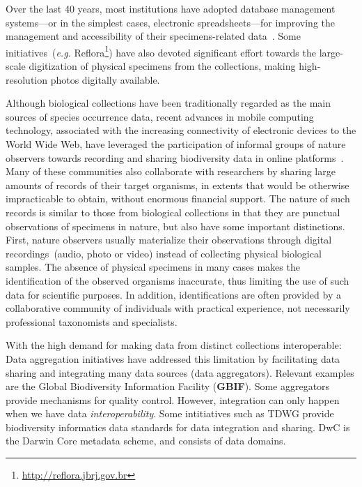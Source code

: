 

Over the last 40 years, most institutions have adopted database management systems---or in the simplest cases, electronic spreadsheets---for improving the management and accessibility of their specimens-related data~\cite{Sunderland2013}.
Some initiatives~(\textit{e.g.} Reflora\footnote{\url{http://reflora.jbrj.gov.br}}) have also devoted significant effort towards the large-scale digitization of physical specimens from the collections, making high-resolution photos digitally available.

Although biological collections have been traditionally regarded as the main sources of species occurrence data, recent advances in mobile computing technology, associated with the increasing connectivity of electronic devices to the World Wide Web, have leveraged the participation of informal groups of nature observers towards recording and sharing biodiversity data in online platforms~\cite{Silvertown2009}.
Many of these communities also collaborate with researchers by sharing large amounts of records of their target organisms, in extents that would be otherwise impracticable to obtain, without enormous financial support.
The nature of such records is similar to those from biological collections in that they are punctual observations of specimens in nature, but also have some important distinctions.
First, nature observers usually materialize their observations through digital recordings~(audio, photo or video) instead of collecting physical biological samples.
The absence of physical specimens in many cases makes the identification of the observed organisms inaccurate, thus limiting the use of such data for scientific purposes.
In addition, identifications are often provided by a collaborative community of individuals with practical experience, not necessarily professional taxonomists and specialists.





With the high demand for making data from distinct collections interoperable:
Data aggregation initiatives have addressed this limitation by facilitating data sharing and integrating many data sources (data aggregators). %
Relevant examples are the Global Biodiversity Information Facility (\textbf{GBIF}).
Some aggregators provide mechanisms for quality control.
However, integration can only happen when we have data \textit{interoperability}.
Some intitiatives such as TDWG provide biodiversity informatics data standards for data integration and sharing.
DwC is the Darwin Core metadata scheme, and consists of data domains. %

